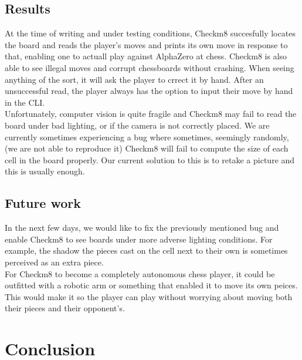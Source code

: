 \documentclass[11pt]{article}
\begin{document}
\subsection{Results}
At the time of writing and under testing conditions,
Checkm8 succesfully locates the board and reads the
player's moves and prints its own move in response to that, enabling
one to actuall play against AlphaZero at chess. Checkm8 is also able to 
see illegal moves and corrupt chessboards without crashing. When seeing
anything of the sort, it will ask the player to crrect it by hand. After an
unsuccessful read, the player always has the option to input their move by 
hand in the CLI.\\

Unfortunately, computer vision is quite fragile and Checkm8 may fail 
to read the board under bad lighting, or if the camera is not correctly 
placed. We are currently sometimes experiencing a bug where sometimes,
seemingly randomly, (we 
are not able to reproduce it) Checkm8 will fail to compute the size of each
cell in the board properly. Our current solution to this is to retake a picture
and this is usually enough.\\
\subsection{Future work}
In the next few days, we would like to fix the previously mentioned bug 
and enable Checkm8 to see boards under more adverse lighting conditions.
For example, the shadow the pieces cast on the cell next to their own is 
sometimes perceived as an extra piece. \\

For Checkm8 to become a completely autonomous chess player, it could 
be outfitted with a robotic arm or something that enabled it to move its 
own peices. This would make it so the player can play without worrying 
about moving both their pieces and their opponent's.\\
\section{Conclusion}
\end{document}
